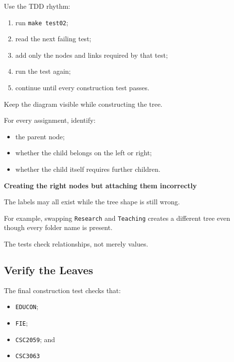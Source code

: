 \documentclass{csc2059practical}
\begin{document}
Use the TDD rhythm:

\begin{enumerate}
    \item run \texttt{make test02};
    \item read the next failing test;
    \item add only the nodes and links required by that test;
    \item run the test again;
    \item continue until every construction test passes.
\end{enumerate}

\begin{tipbox}
Keep the diagram visible while constructing the tree.

For every assignment, identify:

\begin{itemize}
    \item the parent node;
    \item whether the child belongs on the left or right;
    \item whether the child itself requires further children.
\end{itemize}
\end{tipbox}

\begin{commonerror}
\textbf{Creating the right nodes but attaching them incorrectly}

The labels may all exist while the tree shape is still wrong.

For example, swapping \texttt{Research} and \texttt{Teaching} creates a
different tree even though every folder name is present.

The tests check relationships, not merely values.
\end{commonerror}

\subsection{Verify the Leaves}

The final construction test checks that:

\begin{itemize}
    \item \texttt{EDUCON};
    \item \texttt{FIE};
    \item \texttt{CSC2059}; and
    \item \texttt{CSC3063}
\end{itemize}
\end{document}
